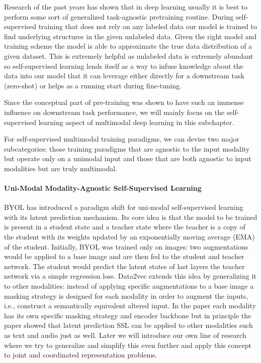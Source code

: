\documentclass[
]{krantz}
\begin{document}
Research of the past years has shown that in deep learning usually it is best to perform some sort of generalized task-agnostic pretraining routine. During self-supervised training that does not rely on any labeled data our model is trained to find underlying structures in the given unlabeled data. Given the right model and training scheme the model is able to approximate the true data distribution of a given dataset. This is extremely helpful as unlabeled data is extremely abundant so self-supervised learning lends itself as a way to infuse knowledge about the data into our model that it can leverage either directly for a downstream task (zero-shot) or helps as a running start during fine-tuning.

Since the conceptual part of pre-training was shown to have such an immense influence on downstream task performance, we will mainly focus on the self-supervised learning aspect of multimodal deep learning in this subchapter.

For self-supervised multimodal training paradigms, we can devise two major subcategories: those training paradigms that are agnostic to the input modality but operate only on a unimodal input and those that are both agnostic to input modalities but are truly multimodal.

\hypertarget{uni-modal-modality-agnostic-self-supervised-learning}{%
\paragraph{Uni-Modal Modality-Agnostic Self-Supervised Learning}\label{uni-modal-modality-agnostic-self-supervised-learning}}

BYOL \citep{grill2020bootstrap} has introduced a paradigm shift for uni-modal self-supervised learning with its latent prediction mechanism. Its core idea is that the model to be trained is present in a student state and a teacher state where the teacher is a copy of the student with its weights updated by an exponentially moving average (EMA) of the student. Initially, BYOL was trained only on images: two augmentations would be applied to a base image and are then fed to the student and teacher network. The student would predict the latent states of last layers the teacher network via a simple regression loss. Data2vec extends this idea by generalizing it to other modalities: instead of applying specific augmentations to a base image a masking strategy is designed for each modality in order to augment the inputs, i.e., construct a semantically equivalent altered input. In the paper each modality has its own specific masking strategy and encoder backbone but in principle the paper showed that latent prediction SSL can be applied to other modalities such as text and audio just as well. Later we will introduce our own line of research where we try to generalize and simplify this even further and apply this concept to joint and coordinated representation problems.
\end{document}
